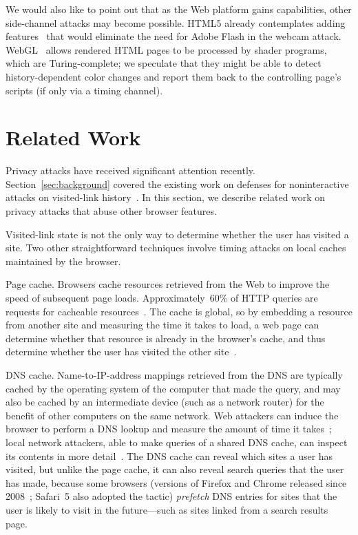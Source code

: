 \documentclass[conference]{IEEEtran}
\begin{document}
We would also like to point out that as the Web platform gains
capabilities, other side-channel attacks may become possible.  HTML5
already contemplates adding features~\cite{html5_device} that would
eliminate the need for Adobe Flash in the webcam attack.
WebGL~\cite{webgl} allows rendered HTML pages to be processed by
shader programs, which are Turing-complete; we speculate that they
might be able to detect history-dependent color changes and report
them back to the controlling page's scripts (if only via a timing
channel).

\section{Related Work}\label{sec:relatedwork}

Privacy attacks have received significant attention
recently. Section~\ref{sec:background} covered the existing work on
defenses for noninteractive attacks on visited-link
history~\cite{bugtraq_visited, moz_visited_bug, jang10empirical,
  jackson06thirdpartycookies, browserrecon, janc10wtikay,
  wondracek10deanon}. In this section, we describe related work on
privacy attacks that abuse other browser features.

Visited-link state is not the only way to determine whether the user
has visited a site.  Two other straightforward techniques involve
timing attacks on local caches maintained by the browser.

\begin{LaTeXdescription}
\item[Page cache.]
  Browsers cache resources retrieved from the Web to improve the speed
  of subsequent page loads. Approximately~60\% of HTTP queries are
  requests for cacheable resources~\cite{wolman99organization}.  The
  cache is global, so by embedding a resource from another site and
  measuring the time it takes to load, a web page can determine
  whether that resource is already in the browser's cache, and thus
  determine whether the user has visited the other
  site~\cite{felten00timing}.

\item[DNS cache.]  Name-to-IP-address mappings retrieved from the DNS
  are typically cached by the operating system of the computer that
  made the query, and may also be cached by an intermediate device
  (such as a network router) for the benefit of other computers on the
  same network.  Web attackers can induce the browser to perform a DNS
  lookup and measure the amount of time it
  takes~\cite{felten00timing}; local network attackers, able to make
  queries of a shared DNS cache, can inspect its contents in more
  detail~\cite{dnsprefetch,dnssnoop}.  The DNS cache can reveal which
  sites a user has visited, but unlike the page cache, it can also
  reveal search queries that the user has made, because some browsers
  (versions of Firefox and Chrome released since 2008~\cite{dnssnoop};
  Safari~5 also adopted the tactic) \emph{prefetch} DNS entries for
  sites that the user is likely to visit in the future---such as sites
  linked from a search results page.
\end{LaTeXdescription}
\end{document}
